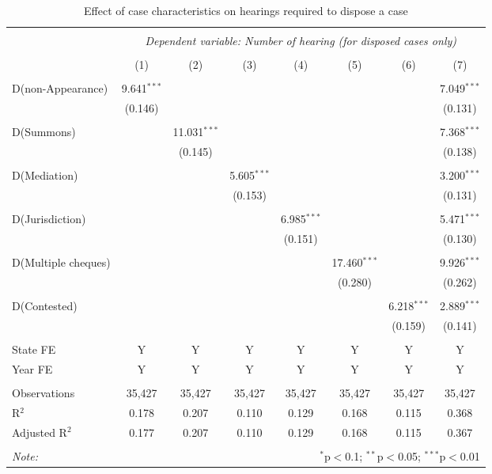 \begin{table}[!ht]
  \caption{Effect of case characteristics on hearings required to dispose a case}\label{tab:hearings_regression}
  \footnotesize \hspace{-0.5cm}
  \begin{tabular}{lccccccc}
    \\[-1.8ex]
    \hline \\[-1.8ex] 
    & \multicolumn{7}{c}{\textit{Dependent variable: Number of hearing (for disposed cases only)}} \\ 
    \cline{2-8} 
    \\[-1.8ex] & (1) & (2) & (3) & (4) & (5) & (6) & (7)\\ 
    \hline \\[-1.8ex]
    D(non-Appearance) & 9.641$^{***}$ &  &  &  &  &  & 7.049$^{***}$ \\ 
    & (0.146) &  &  &  &  &  & (0.131) \\ 
    & & & & & & & \\ 
    D(Summons) &  & 11.031$^{***}$ &  &  &  &  & 7.368$^{***}$ \\ 
    &  & (0.145) &  &  &  &  & (0.138) \\ 
    & & & & & & & \\ 
    D(Mediation) &  &  & 5.605$^{***}$ &  &  &  & 3.200$^{***}$ \\ 
    &  &  & (0.153) &  &  &  & (0.131) \\ 
    & & & & & & & \\ 
    D(Jurisdiction) &  &  &  & 6.985$^{***}$ &  &  & 5.471$^{***}$ \\ 
    &  &  &  & (0.151) &  &  & (0.130) \\ 
    & & & & & & & \\ 
    D(Multiple cheques) &  &  &  &  & 17.460$^{***}$ &  & 9.926$^{***}$ \\ 
    &  &  &  &  & (0.280) &  & (0.262) \\ 
    & & & & & & & \\ 
    D(Contested) &  &  &  &  &  & 6.218$^{***}$ & 2.889$^{***}$ \\ 
    &  &  &  &  &  & (0.159) & (0.141) \\ 
    \hline \\[-1.8ex]
    State FE & Y & Y & Y & Y & Y & Y & Y \\ 
    Year FE & Y & Y & Y & Y & Y & Y & Y \\ 
    \hline \\[-1.8ex] 
    Observations & 35,427 & 35,427 & 35,427 & 35,427 & 35,427 & 35,427 & 35,427 \\ 
    R$^{2}$ & 0.178 & 0.207 & 0.110 & 0.129 & 0.168 & 0.115 & 0.368 \\ 
    Adjusted R$^{2}$ & 0.177 & 0.207 & 0.110 & 0.129 & 0.168 & 0.115 & 0.367 \\ 
    \hline \\[-1.8ex] 
    \textit{Note:}  & \multicolumn{7}{r}{$^{*}$p$<$0.1; $^{**}$p$<$0.05; $^{***}$p$<$0.01} \\ 
  \end{tabular} 
\end{table}

